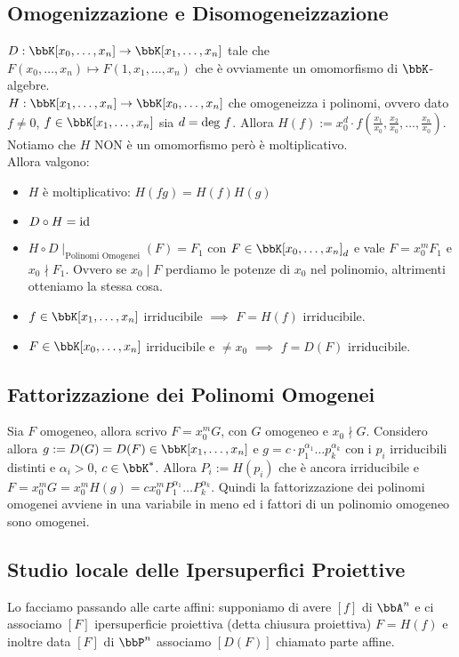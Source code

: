 \documentclass[a4paper,NoNotes,GeneralMath]{stdmdoc}
\begin{document}
	\subsection*{Omogenizzazione e Disomogeneizzazione}
	$D: \bbK[x_0, \ldots, x_n] \rar \bbK[x_1, \ldots, x_n]$ tale che $F(x_0, \ldots, x_n) \mapsto F(1, x_1, \ldots, x_n)$ che è ovviamente un omomorfismo di $\bbK$-algebre. \\
	$H: \bbK[x_1, \ldots, x_n] \rar \bbK[x_0, \ldots, x_n]$ che omogeneizza i polinomi, ovvero dato $f \neq 0$, $f \in \bbK[x_1, \ldots, x_n]$ sia $d = \mbox{deg } f$. Allora $H(f) := x_0^d \cdot f(\frac{x_1}{x_0}, \frac{x_2}{x_0}, \ldots, \frac{x_n}{x_0})$. Notiamo che $H$ NON è un omomorfismo però è moltiplicativo. \\
	Allora valgono:
	\begin{itemize}
		\item $H$ è moltiplicativo: $H(fg) = H(f) H(g)$
		\item $D \circ H = \mbox{id}$
		\item $H \circ D \mid_{\text{Polinomi Omogenei}} (F) = F_1$ con $F \in \bbK[x_0, \ldots, x_n]_d$ e vale $F = x_0^m F_1$ e $x_0 \nmid F_1$. Ovvero se $x_0 \mid F$ perdiamo le potenze di $x_0$ nel polinomio, altrimenti otteniamo la stessa cosa.
		\item $f \in \bbK[x_1, \ldots, x_n]$ irriducibile $\implies$ $F=H(f)$ irriducibile.
		\item $F \in \bbK[x_0, \ldots, x_n]$ irriducibile e $\neq x_0$ $\implies$ $f=D(F)$ irriducibile.
	\end{itemize}

	\subsection*{Fattorizzazione dei Polinomi Omogenei}
	Sia $F$ omogeneo, allora scrivo $F = x_0^m G$, con $G$ omogeneo e $x_0 \nmid G$. Considero allora $g := D(G) = D(F) \in \bbK[x_1, \ldots, x_n]$ e $g = c \cdot p_1^{\alpha_1} \ldots p_k^{\alpha_k}$ con i $p_i$ irriducibili distinti e $\alpha_i > 0$, $c \in \bbK^{*}$. Allora $P_i := H(p_i)$ che è ancora irriducibile e $F = x_0^m G = x_0^m H(g) = c x_0^m P_1^{\alpha_1} \ldots P_k^{\alpha_k}$. Quindi la fattorizzazione dei polinomi omogenei avviene in una variabile in meno ed i fattori di un polinomio omogeneo sono omogenei.
	
	\subsection*{Studio locale delle Ipersuperfici Proiettive}
	Lo facciamo passando alle carte affini: supponiamo di avere $[f]$ di $\bbA^n$ e ci associamo $[F]$ ipersuperficie proiettiva (detta chiusura proiettiva) $F = H(f)$ e inoltre data $[F]$ di $\bbP^n$ associamo $[D(F)]$ chiamato parte affine.
\end{document}
